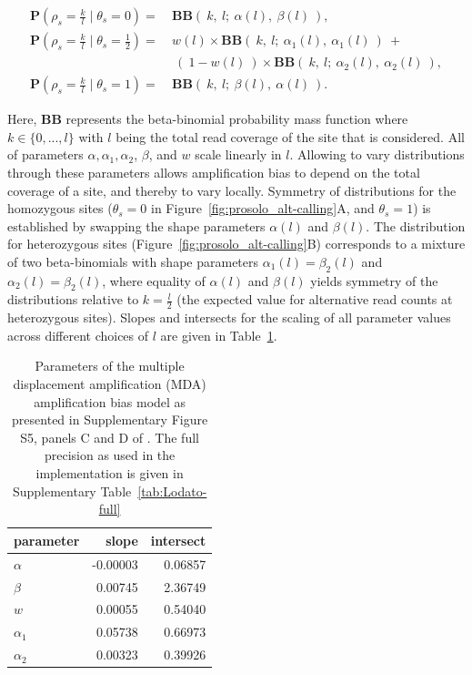 \documentclass[12pt,inline]{wlscirep}
\newcommand{\Prob}{{\mathbf{P}}}
\newcommand{\cB}{{\mathbf{B}}}
\begin{document}
\begin{equation}
	\label{eq:BBLodato}
	\begin{split}
		\Prob(\rho_s = \frac{k}{l} \mid \theta_s = 0 ) 			=~ &\cB\cB(~ k,~ l;~ \alpha(l),~ \beta(l)~ ),\\
		\Prob(\rho_s = \frac{k}{l} \mid \theta_s = \frac12) =~ &w(l) \times \cB\cB(~ k,~ l;~ \alpha_1(l),~ \alpha_1(l)~ )~ +\\
                                                       ~&~(~ 1-w(l)~ ) \times \cB\cB(~ k,~ l;~ \alpha_2(l),~ \alpha_2(l)~ ),\\
		\Prob(\rho_s = \frac{k}{l} \mid \theta_s = 1 ) 			=~ &\cB\cB(~ k,~ l;~ \beta(l),~ \alpha(l)~ ).
	\end{split}
\end{equation}

Here, $\cB\cB$ represents the beta-binomial probability mass function where $k\in\{0,...,l\}$ with $l$ being the total read coverage of the site that is considered. All of parameters $\alpha, \alpha_1,\alpha_2$, $\beta$, and $w$ scale linearly in $l$.
Allowing to vary distributions through these parameters allows amplification bias to depend on the total coverage of a site, and thereby to vary locally.
Symmetry of distributions for the homozygous sites ($\theta_s = 0$ in Figure~\ref{fig:prosolo_alt-calling}A, and $\theta_s = 1$) is established by swapping the shape parameters $\alpha(l)$ and $\beta(l)$.
The distribution for heterozygous sites (Figure~\ref{fig:prosolo_alt-calling}B) corresponds to a mixture of two beta-binomials with shape parameters $\alpha_1(l)=\beta_2(l)$ and $\alpha_2(l)=\beta_2(l)$, where equality of $\alpha(l)$ and $\beta(l)$ yields symmetry of the distributions relative to $k = \frac{l}{2}$ (the expected value for alternative read counts at heterozygous sites).
Slopes and intersects for the scaling of all parameter values across different choices of $l$ are given in Table~\ref{tab:Lodato}.

\begin{table}[tbp]
 \caption{
 Parameters of the multiple displacement amplification (MDA) amplification bias model as presented in Supplementary Figure S5, panels C and D of \cite{lodato_somatic_2015}.
 The full precision as used in the implementation is given in Supplementary Table~\ref{tab:Lodato-full}
 }
 \label{tab:Lodato}
 \renewcommand{\arraystretch}{1.15}

 \begin{center}
  \begin{tabular}{lrr}
   parameter  & slope        & intersect   \\
   \toprule
   $\alpha$   & -0.00003 & 0.06857 \\
   $\beta$    & 0.00745  & 2.36749 \\
   \midrule
   $w$        & 0.00055  & 0.54040 \\
   $\alpha_1$ & 0.05738  & 0.66973 \\
   $\alpha_2$ & 0.00323  & 0.39926 \\
   \bottomrule
  \end{tabular}
 \end{center}
\end{table}
\end{document}
